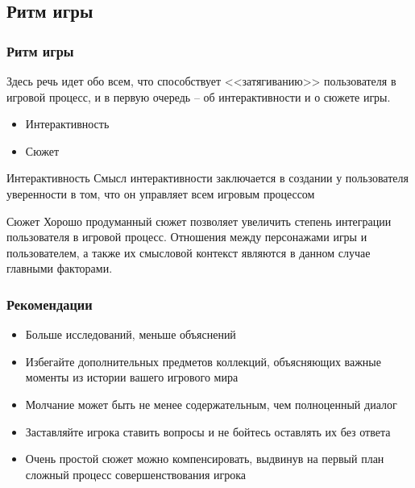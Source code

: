 \documentclass[10pt]{beamer}
\begin{document}
\subsection{Ритм игры}
\begin{frame}
\frametitle{Ритм игры}

\begin{block}{}
  Здесь речь идет обо всем, что способствует <<затягиванию>> пользователя в игровой процесс, и в первую очередь -- об интерактивности и о сюжете игры.
  \begin{itemize}
    \item Интерактивность
    \item Сюжет
  \end{itemize}
\end{block}

\end{frame}

\begin{frame}

\begin{block}{Интерактивность}
  Смысл интерактивности заключается в создании у пользователя уверенности в том, что он управляет всем игровым процессом
\end{block}

\begin{block}{Сюжет}
  Хорошо продуманный сюжет позволяет увеличить степень интеграции пользователя в игровой процесс. Отношения между персонажами игры и пользователем, а также их смысловой контекст являются в данном случае главными факторами.
\end{block}

\end{frame}

\begin{frame}
\frametitle{Рекомендации}

\begin{block}{}
  \begin{itemize}
    \item Больше исследований, меньше объяснений
    \item Избегайте дополнительных предметов коллекций, объясняющих важные моменты из истории вашего игрового мира
    \item Молчание может быть не менее содержательным, чем полноценный диалог
    \item Заставляйте игрока ставить вопросы и не бойтесь оставлять их без ответа
    \item Очень простой сюжет можно компенсировать, выдвинув на первый план сложный процесс совершенствования игрока
  \end{itemize}
\end{block}

\end{frame}
\end{document}

